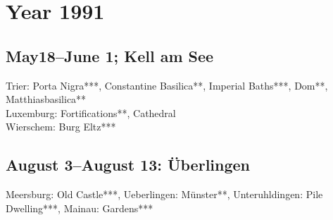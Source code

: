 \chapter{Year 1991}
\label{1991}

\section{May18--June 1; Kell am See}
\label{1991:Kell}


Trier: Porta Nigra***, Constantine Basilica**, Imperial Baths***, Dom**, Matthiasbasilica**\\
Luxemburg: Fortifications**, Cathedral\\
Wierschem: Burg Eltz***\\

\section{August 3--August 13: \"Uberlingen}
\label{1991:Uberlingen}


Meersburg: Old Castle***, Ueberlingen: M\"unster**, Unteruhldingen: Pile Dwelling***, Mainau: Gardens***